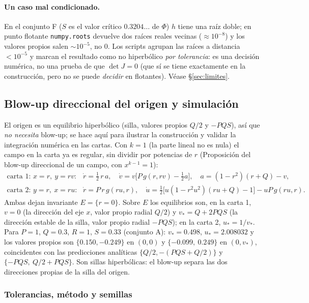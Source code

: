 \documentclass[11pt,a4paper]{article}
\theoremstyle{plain}
\theoremstyle{definition}
\theoremstyle{remark}
\newcommand{\fragmento}[3]{\VerbatimInput[fontsize=\footnotesize,frame=single,framesep=2mm,firstline=#2,lastline=#3]{#1}}
\begin{document}
\paragraph{Un caso mal condicionado.} En el conjunto F ($S$ es el valor crítico $0.3204\ldots$ de $\Phi$) $h$ tiene una raíz doble; en punto flotante \texttt{numpy.roots} devuelve dos raíces reales vecinas ($\approx10^{-8}$) y los valores propios salen $\sim10^{-5}$, no $0$. Los scripts agrupan las raíces a distancia $<10^{-5}$ y marcan el resultado como no hiperbólico \emph{por tolerancia}: es una decisión numérica, no una prueba de que $\det J=0$ (que sí se tiene exactamente en la construcción, pero no se puede \emph{decidir} en flotantes). Véase \S\ref{sec:limites}.

\subsection{Blow-up direccional del origen y simulación}\label{sec:simulacion}

El origen es un equilibrio hiperbólico (silla, valores propios $Q/2$ y $-PQS$), así que \emph{no necesita} blow-up; se hace aquí para ilustrar la construcción y validar la integración numérica en las cartas. Con $k=1$ (la parte lineal no es nula) el campo en la carta ya es regular, sin dividir por potencias de $r$ (Proposición del blow-up direccional de un campo, con $x^{k-1}=1$):
\begin{align*}
\text{carta 1: } x=r,\ y=rv:&\quad \dot r=\tfrac12\,r\,a,\quad \dot v=v\big[P\,g(r,rv)-\tfrac12a\big],\quad a=(1-r^2)(r+Q)-v,\\
\text{carta 2: } y=r,\ x=ru:&\quad \dot r=P\,r\,g(ru,r),\quad \dot u=\tfrac12\big[u(1-r^2u^2)(ru+Q)-1\big]-uP\,g(ru,r).
\end{align*}
Ambas dejan invariante $E=\{r=0\}$. Sobre $E$ los equilibrios son, en la carta 1, $v=0$ (la dirección del eje $x$, valor propio radial $Q/2$) y $v_*=Q+2PQS$ (la dirección estable de la silla, valor propio radial $-PQS$); en la carta 2, $u_*=1/v_*$. Para $P=1$, $Q=0.3$, $R=1$, $S=0.33$ (conjunto A): $v_*=0.498$, $u_*=2.008032$ y los valores propios son $\{0.150,-0.249\}$ en $(0,0)$ y $\{-0.099,\ 0.249\}$ en $(0,v_*)$, coincidentes con las predicciones analíticas $\{Q/2,-(PQS+Q/2)\}$ y $\{-PQS,\ Q/2+PQS\}$. Son sillas hiperbólicas: el blow-up separa las dos direcciones propias de la silla del origen.

\fragmento{codigo/dinamica/sistema.py}{53}{71}

\subsubsection{Tolerancias, método y semillas}\label{sec:tolerancias}
\end{document}
